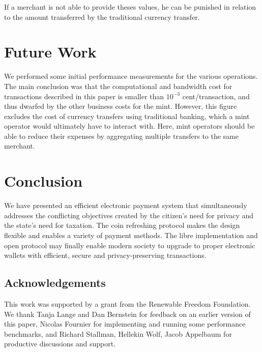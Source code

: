 \documentclass{llncs}
\begin{document}
If a merchant is not able to provide theses values, he can be punished
in relation to the amount transferred by the traditional currency
transfer.


\section{Future Work}


We performed some initial performance measurements for the various
operations.  The main conclusion was that the computational and
bandwidth cost for transactions described in this paper is smaller
than $10^{-3}$ cent/transaction, and thus dwarfed by the other
business costs for the mint.  However, this figure excludes the cost
of currency transfers using traditional banking, which a mint operator
would ultimately have to interact with.  Here, mint operators should
be able to reduce their expenses by aggregating multiple transfers to
the same merchant.


\section{Conclusion}

We have presented an efficient electronic payment system that
simultaneously addresses the conflicting objectives created by the
citizen's need for privacy and the state's need for taxation.  The
coin refreshing protocol makes the design flexible and enables a
variety of payment methods.  The libre implementation and open
protocol may finally enable modern society to upgrade to proper
electronic wallets with efficient, secure and privacy-preserving
transactions.

\subsection*{Acknowledgements}

This work was supported by a grant from the Renewable Freedom Foundation.
We thank Tanja Lange and Dan Bernstein for feedback on an earlier
version of this paper, Nicolas Fournier for implementing and running
some performance benchmarks, and Richard Stallman, Hellekin Wolf,
Jacob Appelbaum for productive discussions and support.
\end{document}
